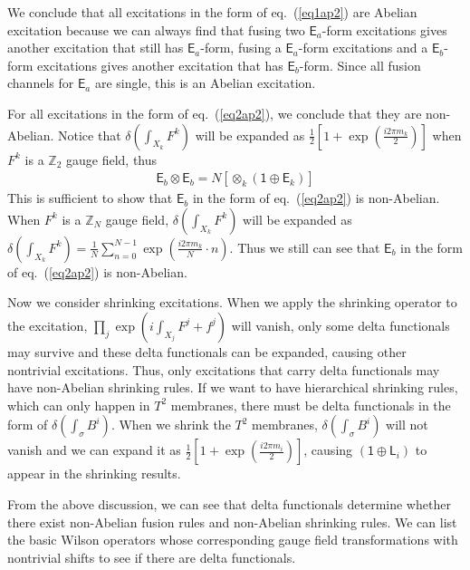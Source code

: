 \documentclass[11pt,nofootinbib,preprint]{revtex4-1}
\begin{document}
We conclude that all excitations in the form of eq.~(\ref{eq1ap2}) are Abelian excitation because we can always find that fusing two $\mathsf{E}_a$-form excitations gives another excitation that still has $\mathsf{E}_a$-form, fusing a $\mathsf{E}_a$-form excitations and a $\mathsf{E}_b$-form excitations gives another excitation that has $\mathsf{E}_b$-form. Since all fusion channels for $\mathsf{E}_a$ are single, this is an Abelian excitation.

For all excitations in the form of eq.~(\ref{eq2ap2}), we conclude that they are non-Abelian. Notice that $\delta \left( \int_{X _k}{F^k} \right) $ will be expanded as $\frac{1}{2}\left[ 1+\exp \left( \frac{i2\pi m_k}{2} \right) \right] $ when $F^k$ is a $\mathbb{Z}_2$ gauge field, thus 
\begin{align}
	\mathsf{E}_b\otimes \mathsf{E}_b=N\left[ \otimes _k\left( \mathsf{1}\oplus \mathsf{E}_k \right) \right] 
\end{align}
This is sufficient to show that $\mathsf{E}_b$ in the form of eq.~(\ref{eq2ap2}) is non-Abelian. When $F^k$ is a $\mathbb{Z}_N$ gauge field, $\delta \left( \int_{X _k}{F^k} \right) $ will be expanded as $\delta \left( \int_{X_k}{F^k} \right) =\frac{1}{N}\sum_{n=0}^{N-1}{\exp \left( \frac{i2\pi m_k}{N}\cdot n \right)}
$. Thus we still can see that $\mathsf{E}_b$ in the form of eq.~(\ref{eq2ap2}) is non-Abelian.

Now we consider shrinking excitations. When we apply the shrinking operator to the excitation, $\prod_j{\exp \left( i\int_{X _j}{F^j+f^j} \right)}$ will vanish, only some delta functionals may survive and these delta functionals can be expanded, causing other nontrivial excitations. Thus, only excitations that carry delta functionals may have non-Abelian shrinking rules. If we want to have hierarchical shrinking rules, which can only happen in $T^2$ membranes, there must be delta functionals in the form of $\delta \left( \int_{\sigma}{B^i} \right) $. When we shrink the $T^2$ membranes, $\delta \left( \int_{\sigma}{B^i} \right) $ will not vanish and we can expand it as $\frac{1}{2}\left[ 1+\exp \left( \frac{i2\pi m_i}{2} \right) \right] $, causing $\left( \mathsf{1}\oplus \mathsf{L}_i \right)$ to appear in the shrinking results.

From the above discussion, we can see that delta functionals determine whether there exist non-Abelian fusion rules and non-Abelian shrinking rules. We can list the basic Wilson operators whose corresponding gauge field transformations with nontrivial shifts to see if there are delta functionals.
\end{document}
